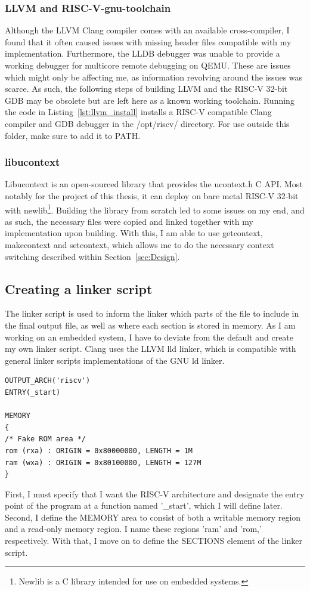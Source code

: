 \subsubsection*{LLVM and RISC-V-gnu-toolchain}
Although the LLVM Clang compiler comes with an available cross-compiler, I found
that it often caused issues with missing header files compatible with my
implementation. Furthermore, the LLDB debugger was unable to provide a working
debugger for multicore remote debugging on QEMU. These are issues which might
only be affecting me, as information revolving around the issues was scarce. As
such, the following steps of building LLVM and the RISC-V 32-bit GDB may be
obsolete but are left here as a known working toolchain. Running the code in
Listing~\ref{lst:llvm_install} installs a RISC-V compatible Clang compiler and
GDB debugger in the /opt/riscv/ directory. For use outside this folder, make
sure to add it to PATH.

\subsubsection*{libucontext}
Libucontext is an open-sourced library that provides the ucontext.h C API. Most
notably for the project of this thesis, it can deploy on bare metal RISC-V
32-bit with newlib\footnote{Newlib is a C library intended for use on embedded
systems.}. Building the library from scratch led to some issues on my end, and
as such, the necessary files were copied and linked together with my
implementation upon building. With this, I am able to use getcontext,
makecontext and setcontext, which allows me to do the necessary context
switching described within Section~\ref{sec:Design}.


\subsection{Creating a linker script}
The linker script is used to inform the linker which parts of the file to
include in the final output file, as well as where each section is stored in
memory. As I am working on an embedded system, I have to deviate from the
default and create my own linker script. Clang uses the LLVM lld linker, which
is compatible with general linker scripts implementations of the GNU ld
linker.\cite{llvm-org-linker}

\begin{lstlisting}[caption=Memory area defined in linker script]
OUTPUT_ARCH('riscv')
ENTRY(_start)

MEMORY
{
/* Fake ROM area */
rom (rxa) : ORIGIN = 0x80000000, LENGTH = 1M
ram (wxa) : ORIGIN = 0x80100000, LENGTH = 127M
}
\end{lstlisting}
First, I must specify that I want the RISC-V architecture and designate the
entry point of the program at a function named '\_start', which I will define
later. Second, I define the MEMORY area to consist of both a writable memory
region and a read-only memory region. I name these regions 'ram' and 'rom,'
respectively. With that, I move on to define the SECTIONS element of the linker
script.

